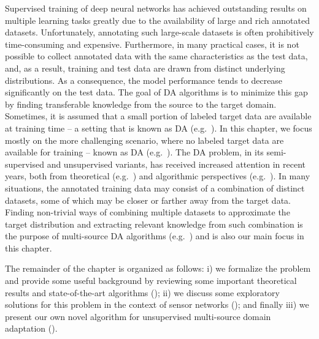 Supervised training of deep neural networks has achieved outstanding results on multiple learning tasks greatly due to the availability of large and rich annotated datasets. Unfortunately, annotating such large-scale datasets is often prohibitively time-consuming and expensive. Furthermore, in many practical cases, it is not possible to collect annotated data with the same characteristics as the test data, and, as a result, training and test data are drawn from distinct underlying distributions. As a consequence, the model performance tends to decrease significantly on the test data. The goal of DA algorithms is to minimize this gap by finding transferable knowledge from the source to the target domain. Sometimes, it is assumed that a small portion of labeled target data are available at training time -- a setting that is known as  DA (e.g.\ \citet{Daume2010, Donahue2013, Kumar2010, Saito2019, Yao2015}). In this chapter, we focus mostly on the more challenging scenario, where no labeled target data are available for training -- known as  DA (e.g.\ \citet{Baktashmotlagh2013, Ganin2015, Kang2019, Long2016a, Zhao2018}). The DA problem, in its semi-supervised and unsupervised variants, has received increased attention in recent years, both from theoretical (e.g.\ \citet{BenDavid2010, BenDavid2007, Blitzer2008, Cortes2014, Gopalan2013, Hoffman2018, Zhao2019}) and algorithmic perspectives (e.g.\ \citet{Ajakan2014, Becker2013, Fernando2013, Jhuo2012, Long2015, Louizos2015, Sun2016, Tzeng2017}). In many situations, the annotated training data may consist of a combination of distinct datasets, some of which may be closer or farther away from the target data. Finding non-trivial ways of combining multiple datasets to approximate the target distribution and extracting relevant knowledge from such combination is the purpose of multi-source DA algorithms (e.g.\ \citet{Kim2017, Guo2018, Hoffman2018, Mansour2009, Sebag2019, Zhang2015, Zhao2018}) and is also our main focus in this chapter.

The remainder of the chapter is organized as follows: i) we formalize the problem and provide some useful background by reviewing some important theoretical results and state-of-the-art algorithms (); ii) we discuss some exploratory solutions for this problem in the context of sensor networks (); and finally iii) we present our own novel algorithm for unsupervised multi-source domain adaptation ().

